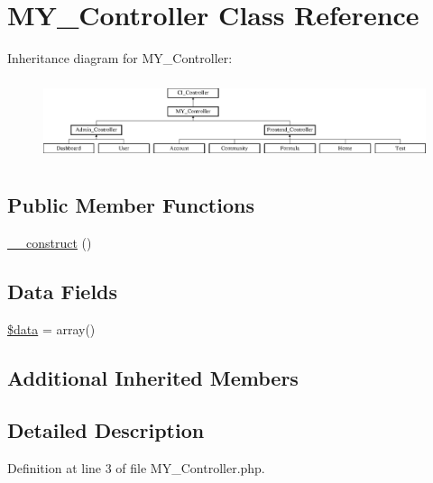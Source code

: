 \hypertarget{class_m_y___controller}{\section{M\-Y\-\_\-\-Controller Class Reference}
\label{class_m_y___controller}
}
Inheritance diagram for M\-Y\-\_\-\-Controller\-:\begin{figure}[H]
\begin{center}
\leavevmode
\includegraphics[height=2.388060cm]{class_m_y___controller}
\end{center}
\end{figure}
\subsection*{Public Member Functions}
\begin{DoxyCompactItemize}
\item 
\hyperlink{class_m_y___controller_a095c5d389db211932136b53f25f39685}{\-\_\-\-\_\-construct} ()
\end{DoxyCompactItemize}
\subsection*{Data Fields}
\begin{DoxyCompactItemize}
\item 
\hyperlink{class_m_y___controller_a6efc15b5a2314dd4b5aaa556a375c6d6}{\$data} = array()
\end{DoxyCompactItemize}
\subsection*{Additional Inherited Members}


\subsection{Detailed Description}


Definition at line 3 of file M\-Y\-\_\-\-Controller.\-php.



